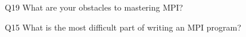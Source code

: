\begin{description}%
\item{Q19} What are your obstacles to mastering MPI?%
\item{Q15} What is the most difficult part of writing an MPI program?%
\end{description}%
